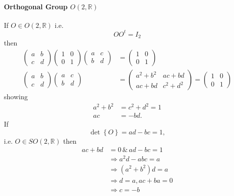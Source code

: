 \documentclass[aps,preprint]{revtex4}
\begin{document}
\paragraph{Orthogonal Group $O\left( 2,\mathbb{R}\right) $}

If $O\in O\left( 2,\mathbb{R}\right) $ i.e. 
\begin{equation}
OO^{t}=I_{2}
\end{equation}%
then 
\begin{align}
\left( 
\begin{array}{cc}
a & b \\ 
c & d%
\end{array}%
\right) \left( 
\begin{array}{cc}
1 & 0 \\ 
0 & 1%
\end{array}%
\right) \left( 
\begin{array}{cc}
a & c \\ 
b & d%
\end{array}%
\right) & =\left( 
\begin{array}{cc}
1 & 0 \\ 
0 & 1%
\end{array}%
\right) \\
\left( 
\begin{array}{cc}
a & b \\ 
c & d%
\end{array}%
\right) \left( 
\begin{array}{cc}
a & c \\ 
b & d%
\end{array}%
\right) & =\left( 
\begin{array}{cc}
a^{2}+b^{2} & ac+bd \\ 
ac+bd & c^{2}+d^{2}%
\end{array}%
\right) =\left( 
\begin{array}{cc}
1 & 0 \\ 
0 & 1%
\end{array}%
\right)
\end{align}%
showing 
\begin{align}
a^{2}+b^{2}& =c^{2}+d^{2}=1 \\
ac& =-bd.
\end{align}%
If 
\begin{equation}
\det \left\{ O\right\} =ad-bc=1,
\end{equation}%
i.e. $O\in SO\left( 2,\mathbb{R}\right) $ then 
\begin{align}
ac+bd& =0\,\&\,ad-bc=1 \\
& \Rightarrow a^{2}d-abc=a \\
& \Rightarrow \left( a^{2}+b^{2}\right) d=a \\
& \Rightarrow d=a,ac+ba=0 \\
& \Rightarrow c=-b
\end{align}%
\end{document}
